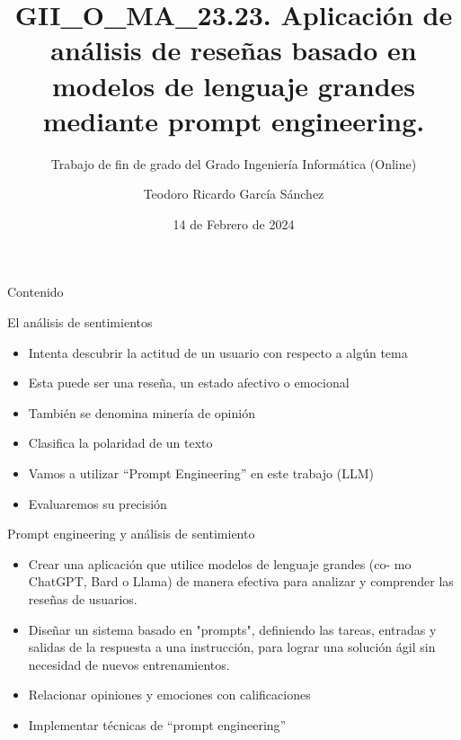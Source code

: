 \documentclass[aspectratio=169,xcolor=dvipsnames, t]{beamer}
\title[Prompt sentiment]{GII\_O\_MA\_23.23. Aplicación de análisis de reseñas basado en modelos de lenguaje grandes mediante prompt engineering.} %
\subtitle{Trabajo de fin de grado del Grado Ingeniería Informática (Online)}
\author[García Sánchez]{Teodoro Ricardo García Sánchez}
\institute[Grado de Ingeniería Informática (Online)]{Grado de Ingeniería Informática (Online)\newline Escuela Politécnica Superior\newline Universidad de Burgos}
\date{14 de Febrero de 2024} %
\begin{document}
\maketitlepage

\begin{frame}[t]{Contenido}
    \tableofcontents
\end{frame}


\begin{frame}{El análisis de sentimientos}
    \begin{itemize}
        \item Intenta descubrir la actitud de un usuario con respecto a algún tema
        \item Esta puede ser una reseña, un estado afectivo o emocional
        \item También se denomina minería de opinión
        \item Clasifica la polaridad de un texto
        \item Vamos a utilizar ``Prompt Engineering'' en este trabajo (LLM)
        \item Evaluaremos su precisión
    \end{itemize}
\end{frame}


\begin{frame}{Prompt engineering y análisis de sentimiento}
    \begin{itemize}
        \item Crear una aplicación que utilice modelos de lenguaje grandes (co- mo ChatGPT, Bard o Llama) de manera efectiva para analizar y comprender las reseñas de usuarios.
        \item Diseñar un sistema basado en "prompts", definiendo las tareas, entradas y salidas de la respuesta a una instrucción, para lograr una solución ágil sin necesidad de nuevos entrenamientos.
        \item Relacionar opiniones y emociones con calificaciones
        \item Implementar técnicas de “prompt engineering”
    \end{itemize}
\end{frame}
\end{document}
